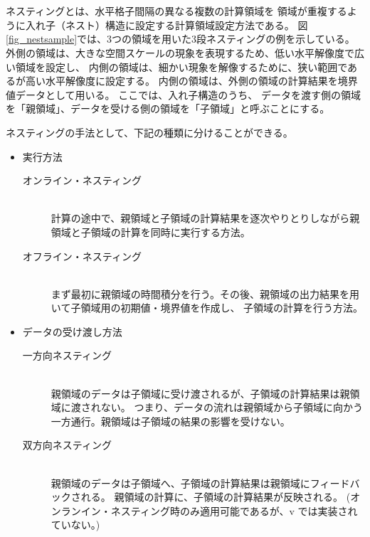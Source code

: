 \section{\SecAdvanceNesting} \label{sec:nest_exp}

ネスティングとは、水平格子間隔の異なる複数の計算領域を
領域が重複するように入れ子（ネスト）構造に設定する計算領域設定方法である。
図\ref{fig_nestsample}では、3つの領域を用いた3段ネスティングの例を示している。
外側の領域は、大きな空間スケールの現象を表現するため、低い水平解像度で広い領域を設定し、
内側の領域は、細かい現象を解像するために、狭い範囲であるが高い水平解像度に設定する。
内側の領域は、外側の領域の計算結果を境界値データとして用いる。
ここでは、入れ子構造のうち、
データを渡す側の領域を「親領域」、データを受ける側の領域を「子領域」と呼ぶことにする。

ネスティングの手法として、下記の種類に分けることができる。
\begin{itemize}
\item 実行方法
\begin{description}
 \item[オンライン・ネスティング]\mbox{}\\
計算の途中で、親領域と子領域の計算結果を逐次やりとりしながら親領域と子領域の計算を同時に実行する方法。
 \item[オフライン・ネスティング]\mbox{}\\
まず最初に親領域の時間積分を行う。その後、親領域の出力結果を用いて子領域用の初期値・境界値を作成し、
子領域の計算を行う方法。
\end{description}
\item データの受け渡し方法
\begin{description}
 \item[一方向ネスティング]\mbox{}\\
親領域のデータは子領域に受け渡されるが、子領域の計算結果は親領域に渡されない。
つまり、データの流れは親領域から子領域に向かう一方通行。親領域は子領域の結果の影響を受けない。
 \item[双方向ネスティング]\mbox{}\\
親領域のデータは子領域へ、子領域の計算結果は親領域にフィードバックされる。
親領域の計算に、子領域の計算結果が反映される。
(オンランイン・ネスティング時のみ適用可能であるが、\scalerm v{\version} では実装されていない。)
\end{description}
\end{itemize}

